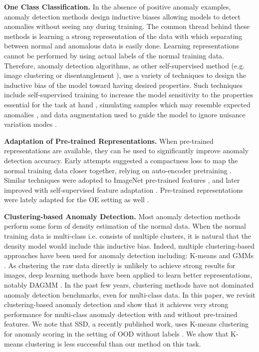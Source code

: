 \documentclass[runningheads]{llncs}
\begin{document}
\noindent\textbf{One Class Classification.} In the absence of positive anomaly examples, anomaly detection methods design inductive biases allowing models to detect anomalies without seeing any during training. The common thread behind these methods is learning a strong representation of the data with which separating between normal and anomalous data is easily done.  Learning representations cannot be performed by using actual labels of the normal training data.  Therefore, anomaly detection algorithms, as other self-supervised method (e.g. image clustering \cite{van2020scan} or disentanglement \cite{kingma2013auto}), use a variety of techniques to design the inductive bias of the model toward having desired properties. Such techniques include self-supervised training to increase the model sensitivity to the properties essential for the task at hand \cite{hendrycks2019using,golan2018deep}, simulating samples which may resemble expected anomalies \cite{li2021cutpaste}, and data augmentation used to guide the model to ignore nuisance variation modes \cite{tack2020csi}. 

\noindent\textbf{Adaptation of Pre-trained Representations.} When pre-trained representations are available, they can be used to significantly improve anomaly detection accuracy. Early attempts   suggested a compactness loss to map the normal training data closer together, relying on auto-encoder pretraining \cite{ruff2018deep}. Similar techniques were adopted to ImageNet pre-trained features \cite{perera2019learning}, and later improved with self-supervised feature adaptation \cite{reiss2021panda,rippel2021transfer,reiss2021mean}. Pre-trained representations were lately adapted for the OE setting as well \cite{reiss2021panda,deecke2021transfer}.


\noindent\textbf{Clustering-based Anomaly Detection.} Most anomaly detection methods perform some form of density estimation of the normal data. When the normal training data is multi-class i.e. consists of multiple clusters, it is natural that the density model would include this inductive bias. Indeed, multiple clustering-based approaches have been used for anomaly detection including: K-means \cite{munz2007traffic} and GMMs \cite{li2016anomaly}. As clustering the raw data directly is unlikely to achieve strong results for images, deep learning methods have been applied to learn better representations, notably DAGMM \cite{zong2018deep}. In the past few years, clustering methods have not dominated anomaly detection benchmarks, even for multi-class data. In this paper, we revisit clustering-based anomaly detection and show that it achieves very strong performance for multi-class anomaly detection with and without pre-trained features. We note that SSD, a recently published work, uses K-means clustering for anomaly scoring in the setting of OOD without labels \cite{sehwag2021ssd}. We show that K-means clustering is less successful than our method on this task.
\end{document}
